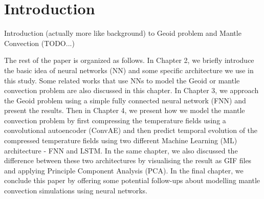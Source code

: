 \chapter{Introduction}

Introduction (actually more like background) to Geoid problem and Mantle Convection (TODO...)

The rest of the paper is organized as follows. In Chapter 2, we briefly introduce the basic idea of neural networks (NN) and some specific architecture we use in this study. Some related works that use NNs to model the Geoid or mantle convection problem are also discussed in this chapter. In Chapter 3, we approach the Geoid problem using a simple fully connected neural network (FNN) and present the results. Then in Chapter 4, we present how we model the mantle convection problem by first compressing the temperature fields using a convolutional autoencoder (ConvAE) and then predict temporal evolution of the compressed temperature fields using two different Machine Learning (ML) architecture - FNN and LSTM. In the same chapter, we also discussed the difference between these two architectures by visualising the result as GIF files and applying Principle Component Analysis (PCA). In the final chapter, we conclude this paper by offering some potential follow-ups about modelling mantle convection simulations using neural networks.



